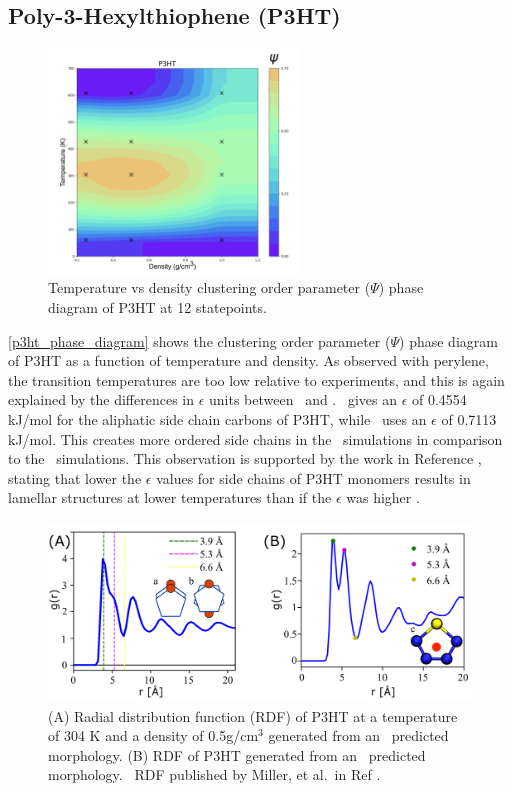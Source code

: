 \subsection{Poly-3-Hexylthiophene (P3HT)}
\begin{figure}[h!]
    \centering
    \includegraphics[width=0.6\textwidth]{src/figures/FF_figs/p3htPD.png} %
    \caption{Temperature vs density clustering order parameter ($\Psi$) phase diagram of P3HT at 12 statepoints.}
    \label{p3ht_phase_diagram}
\end{figure}
\autoref{p3ht_phase_diagram} shows the clustering order parameter ($\Psi$) phase diagram of P3HT as a function of temperature and density. 
 As observed with perylene, the transition temperatures are too low relative to experiments, and this is again explained by the differences in $\epsilon$ units between \espff~and \oplsff.
 \espff~gives an $\epsilon$ of 0.4554 kJ/mol for the aliphatic side chain carbons of P3HT, while \oplsff~uses an $\epsilon$ of 0.7113 kJ/mol. 
 This creates more ordered side chains in the \oplsff~simulations in comparison to the \espff~simulations. 
 This observation is supported by the work in Reference \citep{marsh_controlling_2014}, stating that lower the $\epsilon$ values for side chains of P3HT monomers results in lamellar structures at lower temperatures than if the $\epsilon$ was higher \citep{marsh_controlling_2014}. 
\begin{figure}[h!]
    \centering
    \includegraphics[width=.75\textwidth]{src/figures/FF_figs/p3ht_rdf.png}
    \caption{(A) Radial distribution function (RDF) of P3HT at a temperature of 304 K and a density of 0.5g/cm$^3$ generated from an \espff~predicted morphology. 
 (B) RDF of P3HT generated from an \oplsff~predicted morphology. 
 \oplsff~RDF published by Miller, et al.~in Ref \citep{miller_optimization_2018}.}
    \label{P3HT RDF}
\end{figure}
